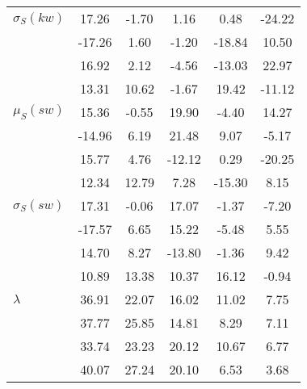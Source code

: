 \begin{table*}[h!]
\begin{center}
\begin{tabular}{l | c c c c c}
$\sigma_S(kw)$ & 17.26  & -1.70  & 1.16  & 0.48  & -24.22 \\
 & -17.26  & 1.60  & -1.20  & -18.84  & 10.50 \\
 & 16.92  & 2.12  & -4.56  & -13.03  & 22.97 \\
 & 13.31  & 10.62  & -1.67  & 19.42  & -11.12 \\\hline
$\mu_S(sw)$ & 15.36  & -0.55  & 19.90  & -4.40  & 14.27 \\
 & -14.96  & 6.19  & 21.48  & 9.07  & -5.17 \\
 & 15.77  & 4.76  & -12.12  & 0.29  & -20.25 \\
 & 12.34  & 12.79  & 7.28  & -15.30  & 8.15 \\\hline
$\sigma_S(sw)$ & 17.31  & -0.06  & 17.07  & -1.37  & -7.20 \\
 & -17.57  & 6.65  & 15.22  & -5.48  & 5.55 \\
 & 14.70  & 8.27  & -13.80  & -1.36  & 9.42 \\
 & 10.89  & 13.38  & 10.37  & 16.12  & -0.94 \\\hline\hline
$\lambda$ & 36.91  & 22.07  & 16.02  & 11.02  & 7.75 \\
 & 37.77  & 25.85  & 14.81  & 8.29  & 7.11 \\
 & 33.74  & 23.23  & 20.12  & 10.67  & 6.77 \\
 & 40.07  & 27.24  & 20.10  & 6.53  & 3.68 \\
\end{tabular}
\end{center}
\end{table*}

